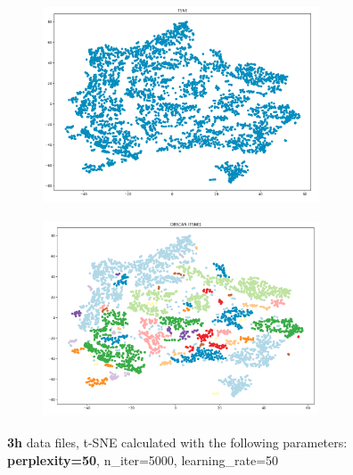 \begin{figure}[H]
  \centering
	\begin{subfigure}{.5\textwidth}
    \centering
    \includegraphics[width=0.9\textwidth]{./images/tsneParametersTest/perplexity/perp50-3hTSNE.png}
  \end{subfigure}%
  \begin{subfigure}{.5\textwidth}
    \centering
    \includegraphics[width=0.9\textwidth]{./images/tsneParametersTest/perplexity/perp50-3hDBSCAN.png}
	\end{subfigure}
	\caption{\textbf{3h} data files, t-SNE calculated with the following parameters: \textbf{perplexity=50}, n\_iter=5000, learning\_rate=50}
  \label{figure:3hperp50TSNE}
\end{figure}






